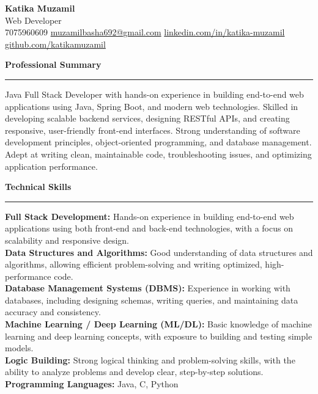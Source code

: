 \documentclass[letterpaper,11pt]{article}
\newcommand{\sectionrule}{%
  \vspace{1pt}%
  \noindent\rule{\linewidth}{0.7pt}%
  \vspace{1pt}%
}
\newcommand{\resumesection}[1]{%
  \vspace{4pt}%
  {\large\textbf{#1}}%
  \sectionrule%
}
\begin{document}
\begin{center}
  {\LARGE\textbf{Katika Muzamil}}\\[2pt]
  {\small Web Developer}\\[2pt]
  {\small
    7075960609 \textbar{}
    \href{mailto:muzamilbasha692@gmail.com}{muzamilbasha692@gmail.com} \textbar{}
    \href{https://www.linkedin.com/in/katika-muzamil-7a9a35304/}{linkedin.com/in/katika-muzamil} \textbar{}
    \href{https://github.com/katikamuzamil}{github.com/katikamuzamil}
  }
\end{center}
\vspace{-2pt}

\resumesection{Professional Summary}
\vspace{1pt}
\small{Java Full Stack Developer with hands-on experience in building end-to-end web applications using Java, Spring Boot, and modern web technologies. Skilled in developing scalable backend services, designing RESTful APIs, and creating responsive, user-friendly front-end interfaces. Strong understanding of software development principles, object-oriented programming, and database management. Adept at writing clean, maintainable code, troubleshooting issues, and optimizing application performance.}

\resumesection{Technical Skills}
\vspace{1pt}
\small{
\textbf{Full Stack Development:} Hands-on experience in building end-to-end web applications using both front-end and back-end technologies, with a focus on scalability and responsive design.\\[1pt]
\textbf{Data Structures and Algorithms:} Good understanding of data structures and algorithms, allowing efficient problem-solving and writing optimized, high-performance code.\\[1pt]
\textbf{Database Management Systems (DBMS):} Experience in working with databases, including designing schemas, writing queries, and maintaining data accuracy and consistency.\\[1pt]
\textbf{Machine Learning / Deep Learning (ML/DL):} Basic knowledge of machine learning and deep learning concepts, with exposure to building and testing simple models.\\[1pt]
\textbf{Logic Building:} Strong logical thinking and problem-solving skills, with the ability to analyze problems and develop clear, step-by-step solutions.\\[1pt]
\textbf{Programming Languages:} Java, C, Python
}
\end{document}
